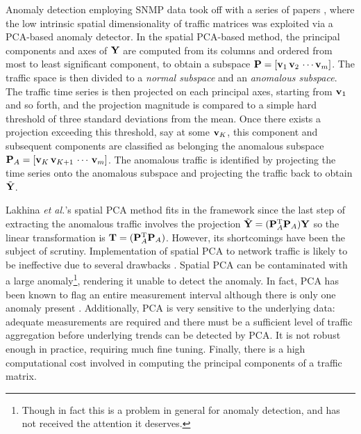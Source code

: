 Anomaly detection employing SNMP data took off with a series of papers
\cite{Lakhina04Anomaly,Lakhina04Diagnosing,Lakhina05Mining,Li06Anomaly},
where the low intrinsic spatial dimensionality of traffic matrices was
exploited via a PCA-based anomaly detector. In the spatial PCA-based
method, the principal components and axes of $\mathbf{Y}$ are computed from
its columns and ordered from most to least significant component, to
obtain a subspace $\mathbf{P} = \lbrack\mathbf{v}_1\, \mathbf{v}_2\, \cdots
\mathbf{v}_m\rbrack$. The traffic space is then divided to a \emph{normal
  subspace} and an \emph{anomalous subspace}. The traffic time series
is then projected on each principal axes, starting from $\mathbf{v}_1$ and so
forth, and the projection magnitude is compared to a simple hard
threshold of three standard deviations from the mean. Once there
exists a projection exceeding this threshold, say at some $\mathbf{v}_{K}$,
this component and subsequent components are classified as belonging
the anomalous subspace $\mathbf{P}_A = \lbrack \mathbf{v}_K\,\mathbf{v}_{K+1}\,
\cdots\,\mathbf{v}_m\rbrack$. The anomalous traffic is identified by
projecting the time series onto the anomalous subspace and projecting
the traffic back to obtain $\tilde {\mathbf{Y}}$.

Lakhina \textit{et al.}'s spatial PCA method fits in the framework since the last step
of extracting the anomalous traffic involves the projection $\tilde
{\mathbf{Y}} = (\mathbf{P}_A^{\mathrm{T}} \mathbf{P}_A) \mathbf{Y}$ so the linear transformation is $\mathbf{T} =
(\mathbf{P}_A^{\mathrm{T}} \mathbf{P}_A)$.  However, its shortcomings have been the subject of
scrutiny. Implementation of spatial PCA to network traffic is likely
to be ineffective due to several drawbacks
\cite{Ringberg07PCA,Zhang05Anomography}. Spatial PCA can be
contaminated with a large anomaly\footnote{Though in fact this is a
  problem in general for anomaly detection, and has not received the
  attention it deserves.}, rendering it unable to detect the
anomaly. In fact, PCA has been known to flag an entire measurement
interval although there is only one anomaly present
\cite{Zhang05Anomography}. Additionally, PCA is very sensitive to the
underlying data: adequate measurements are required and there must be
a sufficient level of traffic aggregation before underlying trends can
be detected by PCA. It is not robust enough in practice, requiring
much fine tuning. Finally, there is a high computational cost involved
in computing the principal components of a traffic matrix.

